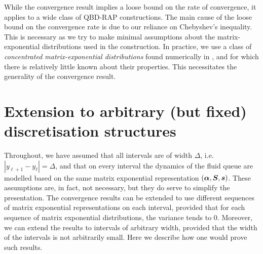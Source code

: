 \begin{rem}
	While the convergence result implies a loose bound on the rate of convergence, it applies to a wide class of QBD-RAP constructions. The main cause of the loose bound on the convergence rate is due to our reliance on Chebyshev's inequality. This is necessary as we try to make minimal assumptions about the matrix-exponential distributions used in the construction. In practice, we use a class of \emph{concentrated matrix-exponential distributions} found numerically in \cite{hhat2020}, and for which there is relatively little known about their properties. This necessitates the generality of the convergence result. 
\end{rem}

\section{Extension to arbitrary (but fixed) discretisation structures}
Throughout, we have assumed that all intervals are of width \(\Delta\), i.e.~\(|y_{\ell+1}-y_\ell|=\Delta\), and that on every interval the dynamics of the fluid queue are modelled based on the same matrix exponential representation \((\boldsymbol \alpha, \boldsymbol S, \boldsymbol s)\). These assumptions are, in fact, not necessary, but they do serve to simplify the presentation. The convergence results can be extended to use different sequences of matrix exponential representations on each interval, provided that for each sequence of matrix exponential distributions, the variance tends to \(0\). Moreover, we can extend the results to intervals of arbitrary width, provided that the width of the intervals is not arbitrarily small. Here we describe how one would prove such results.

